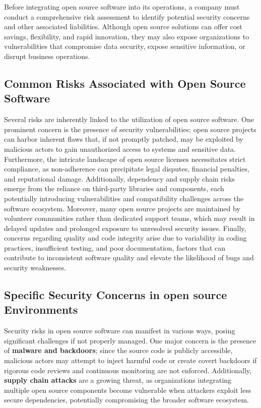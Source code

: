 Before integrating open source software into its operations, a company must conduct a comprehensive risk assessment to identify potential security concerns and other associated liabilities. Although open source solutions can offer cost savings, flexibility, and rapid innovation, they may also expose organizations to vulnerabilities that compromise data security, expose sensitive information, or disrupt business operations.

\subsection{Common Risks Associated with Open Source Software}

Several risks are inherently linked to the utilization of open source software. One prominent concern is the presence of security vulnerabilities; open source projects can harbor inherent flaws that, if not promptly patched, may be exploited by malicious actors to gain unauthorized access to systems and sensitive data. Furthermore, the intricate landscape of open source licenses necessitates strict compliance, as non-adherence can precipitate legal disputes, financial penalties, and reputational damage. Additionally, dependency and supply chain risks emerge from the reliance on third-party libraries and components, each potentially introducing vulnerabilities and compatibility challenges across the software ecosystem. Moreover, many open source projects are maintained by volunteer communities rather than dedicated support teams, which may result in delayed updates and prolonged exposure to unresolved security issues. Finally, concerns regarding quality and code integrity arise due to variability in coding practices, insufficient testing, and poor documentation, factors that can contribute to inconsistent software quality and elevate the likelihood of bugs and security weaknesses.

\cite{OpenSource-Software-Risks-Disadvantages}

\subsection{Specific Security Concerns in open source Environments}
Security risks in open source software can manifest in various ways, posing significant challenges if not properly managed. One major concern is the presence of \textbf{malware and backdoors}; since the source code is publicly accessible, malicious actors may attempt to inject harmful code or create covert backdoors if rigorous code reviews and continuous monitoring are not enforced. Additionally, \textbf{supply chain attacks} are a growing threat, as organizations integrating multiple open source components become vulnerable when attackers exploit less secure dependencies, potentially compromising the broader software ecosystem. 

